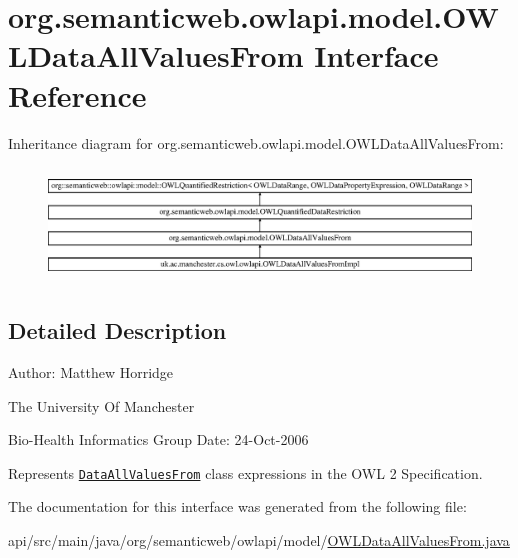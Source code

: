 \hypertarget{interfaceorg_1_1semanticweb_1_1owlapi_1_1model_1_1_o_w_l_data_all_values_from}{\section{org.\-semanticweb.\-owlapi.\-model.\-O\-W\-L\-Data\-All\-Values\-From Interface Reference}
\label{interfaceorg_1_1semanticweb_1_1owlapi_1_1model_1_1_o_w_l_data_all_values_from}
}
Inheritance diagram for org.\-semanticweb.\-owlapi.\-model.\-O\-W\-L\-Data\-All\-Values\-From\-:\begin{figure}[H]
\begin{center}
\leavevmode
\includegraphics[height=3.043478cm]{interfaceorg_1_1semanticweb_1_1owlapi_1_1model_1_1_o_w_l_data_all_values_from}
\end{center}
\end{figure}


\subsection{Detailed Description}
Author\-: Matthew Horridge\par
 The University Of Manchester\par
 Bio-\/\-Health Informatics Group Date\-: 24-\/\-Oct-\/2006 

Represents \href{http://www.w3.org/TR/2009/REC-owl2-syntax-20091027/#Universal_Quantification_2}{\tt Data\-All\-Values\-From} class expressions in the O\-W\-L 2 Specification. 

The documentation for this interface was generated from the following file\-:\begin{DoxyCompactItemize}
\item 
api/src/main/java/org/semanticweb/owlapi/model/\hyperlink{_o_w_l_data_all_values_from_8java}{O\-W\-L\-Data\-All\-Values\-From.\-java}\end{DoxyCompactItemize}
